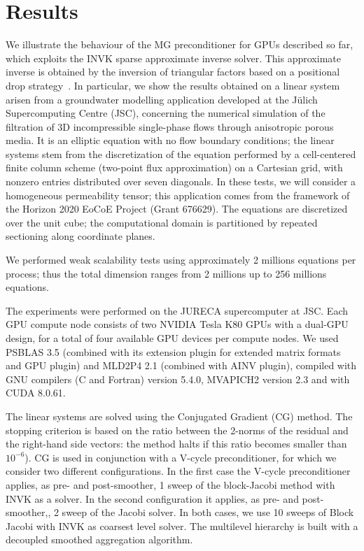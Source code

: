 \section{Results\label{results}}

We illustrate the behaviour of the MG preconditioner for GPUs described so far,
which exploits the INVK sparse approximate inverse solver. This approximate
inverse is obtained by the inversion of triangular
factors based on a positional drop strategy~\cite{vanDuin:99,BERTACCINI2016693}.
In particular, we show the results obtained on a linear system
arisen from a groundwater modelling application developed at the
J\"ulich Supercomputing Centre (JSC), concerning the numerical simulation
of the filtration of 3D incompressible single-phase flows through
anisotropic porous media. It is an elliptic equation with no flow
boundary conditions;  the linear systems stem from the discretization
of the equation performed by a cell-centered finite column scheme
(two-point flux approximation) on a Cartesian grid, with nonzero
entries distributed over seven diagonals. In these tests, we will
consider a homogeneous permeability tensor;  this application comes
from the framework of the Horizon 2020 EoCoE Project (Grant
676629). The equations are discretized over the unit cube; the
computational domain is partitioned by repeated sectioning along
coordinate planes. 

We performed weak scalability tests using approximately 2 millions
equations per process; thus  the total dimension ranges from 2
millions up to 256 millions equations. 

The experiments were performed on  the JURECA supercomputer at JSC.
Each GPU compute node consists
of two NVIDIA Tesla K80 GPUs with a dual-GPU design, for a total of
four available GPU devices per compute nodes.   
We used PSBLAS 3.5 (combined with its extension plugin for extended
matrix formats and GPU plugin) and MLD2P4 2.1 (combined with AINV
plugin),  compiled with  GNU compilers (C and Fortran) version 5.4.0,
MVAPICH2 version 2.3 and with CUDA 8.0.61. 

The linear systems are solved using the Conjugated Gradient (CG) method.
The stopping criterion is based on the ratio between the 2-norms of the
residual and the right-hand side vectors: the method halts if this ratio becomes smaller than $10^{-6}$).
CG is used in conjunction with a V-cycle preconditioner, for
which we consider two different configurations. In the first case the
V-cycle preconditioner applies, as pre- and post-smoother, 1 sweep of
the block-Jacobi method with INVK as a solver. In the
second configuration it applies, as pre- and post-smoother,, 2 sweep
of the Jacobi solver. In both cases, we use 10 sweeps of Block Jacobi with INVK  as
coarsest level solver.   The multilevel hierarchy is built with a
decoupled smoothed aggregation algorithm. 

